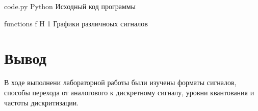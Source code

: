 \documentclass{bmstu}
\begin{document}
    {code.py} 
    {Python} %
    {Исходный код программы} %
    
	{functions}
	{f}
	{H}
	{1\textwidth}
	{Графики различноых сигналов}

\section*{Вывод}
В ходе выполнени лабораторной работы были изучены форматы сигналов, способы перехода от аналогового к дискретному сигналу, уровни квантования и частоты дискритизации.
\end{document}
